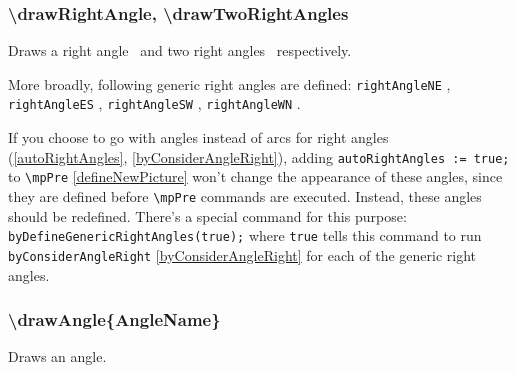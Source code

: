 
	




\subsubsection{\textbackslash drawRightAngle, \textbackslash drawTwoRightAngles}
	Draws a right angle \drawRightAngle\ and two right angles \drawTwoRightAngles\ respectively. 
	
	More broadly, following generic right angles are defined: \texttt{rightAngleNE} ,  \texttt{rightAngleES} ,  \texttt{rightAngleSW} ,  \texttt{rightAngleWN} . 
	
	If you choose to go with angles instead of arcs for right angles (\ref{autoRightAngles}, \ref{byConsiderAngleRight}), adding \texttt{autoRightAngles := true;} to \texttt{\textbackslash mpPre} \ref{defineNewPicture} won't change the appearance of these angles, since they are defined before \texttt{\textbackslash mpPre} commands are executed. Instead, these angles should be redefined. There's a special command for this purpose: \texttt{byDefineGenericRightAngles(true);} where \texttt{true} tells this command to run \texttt{byConsiderAngleRight} \ref{byConsiderAngleRight} for each of the generic right angles.

\subsubsection{\textbackslash drawAngle\{AngleName\}}\label{drawAngle}

	Draws an angle.
	

